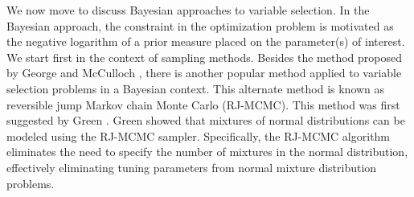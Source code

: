 We now move to discuss Bayesian approaches to variable selection. In the Bayesian approach, the constraint in the optimization problem is motivated as the negative logarithm of a prior measure placed on the parameter(s) of interest. We start first in the context of sampling methods. Besides the method proposed by George and McCulloch \cite{george1993variable}, there is another popular method applied to variable selection problems in a Bayesian context. This alternate method is known as reversible jump Markov chain Monte Carlo (RJ-MCMC). This method was first suggested by Green \cite{green1995reversible}. Green showed that mixtures of normal distributions can be modeled using the RJ-MCMC sampler. Specifically, the RJ-MCMC algorithm eliminates the need to specify the number of mixtures in the normal distribution, effectively eliminating tuning parameters from normal mixture distribution problems.

